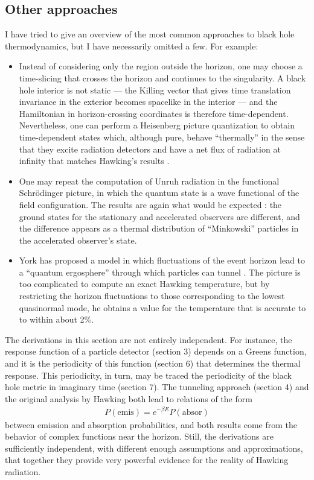 \documentclass[11pt]{article}
\begin{document}
\subsection{Other approaches \label{otherb}}

I have tried to give an overview of the most common approaches to
black hole thermodynamics, but I have necessarily omitted a few.  
For example:

\begin{itemize}
\item Instead of considering only  the region outside the horizon, 
one may choose a time-slicing that crosses the horizon and continues 
to the singularity.  A black hole interior is not static --- the Killing 
vector that gives time translation invariance in the exterior 
becomes spacelike in the interior --- and the Hamiltonian in 
horizon-crossing coordinates is therefore time-dependent.
Nevertheless, one can perform a Heisenberg picture quantization to
obtain time-dependent states which, although pure, behave
``thermally'' in the sense that they excite radiation detectors and have
a net flux of radiation at infinity that matches Hawking's results
\cite{Melnikov}.  

\item One may repeat the computation of Unruh radiation in the functional
Schr{\"o}dinger picture, in which the quantum state is a wave functional
of the field configuration.   The results are again what would be expected 
\cite{Freese}: the ground states for the stationary and accelerated 
observers are different, and the difference appears as a thermal
distribution of ``Minkowski'' particles in the accelerated observer's
state. 

\item York has proposed a model in which fluctuations of 
the event horizon lead to a ``quantum ergosphere'' through which
particles can tunnel \cite{York}.  The picture is too complicated
to  compute an exact Hawking temperature, but by 
restricting the horizon fluctuations to those corresponding to the
lowest quasinormal mode, he obtains a value for the temperature 
that is accurate to to within about 2\%.
\end{itemize}

The derivations  
in this section are not  entirely independent.  For instance, the 
response function of a particle detector (section 3)
depends on a Greens function, and it is the periodicity of 
this function (section 6) that determines the thermal response.   
This periodicity, in turn, may be traced the periodicity 
of the black hole metric in imaginary time (section 7).  The 
tunneling approach (section 4) and the original analysis
by Hawking both lead to relations of the form
\begin{align*}
P(\mathrm{emis}) = e^{-\beta E}P(\mathrm{absor})
\end{align*}
between emission and absorption probabilities, and
both results come from the behavior of complex functions
near the horizon.   Still, the derivations
are sufficiently independent, with different enough assumptions and
approximations, that together they provide very powerful evidence for
the reality of Hawking radiation.
\end{document}
